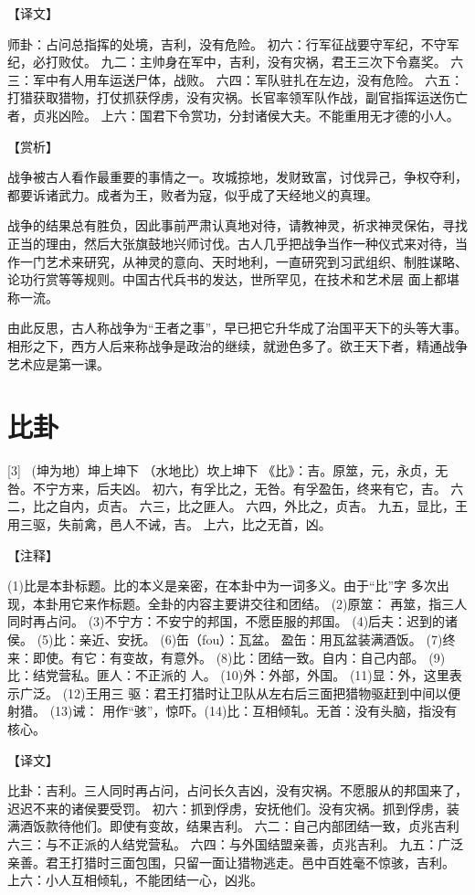 \documentclass[12pt,UTF8]{ctexbook}
\begin{document}
【译文】

师卦：占问总指挥的处境，吉利，没有危险。
初六：行军征战要守军纪，不守军纪，必打败仗。
九二：主帅身在军中，吉利，没有灾祸，君王三次下令嘉奖。
六三：军中有人用车运送尸体，战败。
六四：军队驻扎在左边，没有危险。
六五：打猎获取猎物，打仗抓获俘虏，没有灾祸。长官率领军队作战，副官指挥运送伤亡者，贞兆凶险。
上六：国君下令赏功，分封诸侯大夫。不能重用无才德的小人。

【赏析】

战争被古人看作最重要的事情之一。攻城掠地，发财致富，讨伐异己，争权夺利，都要诉诸武力。成者为王，败者为寇，似乎成了天经地义的真理。

战争的结果总有胜负，因此事前严肃认真地对待，请教神灵，祈求神灵保佑，寻找正当的理由，然后大张旗鼓地兴师讨伐。古人几乎把战争当作一种仪式来对待，当作一门艺术来研究，从神灵的意向、天时地利，一直研究到习武组织、制胜谋略、论功行赏等等规则。中国古代兵书的发达，世所罕见，在技术和艺术层 面上都堪称一流。

由此反思，古人称战争为“王者之事”，早已把它升华成了治国平天下的头等大事。相形之下，西方人后来称战争是政治的继续，就逊色多了。欲王天下者，精通战争艺术应是第一课。

\chapter{比卦}
[3] \ (坤为地）坤上坤下
（水地比）坎上坤下
《比》：吉。原筮，元，永贞，无咎。不宁方来，后夫凶。
初六，有孚比之，无咎。有孚盈缶，终来有它，吉。
六二，比之自内，贞吉。
六三，比之匪人。
六四，外比之，贞吉。
九五，显比，王用三驱，失前禽，邑人不诫，吉。
上六，比之无首，凶。

【注释】

(1)比是本卦标题。比的本义是亲密，在本卦中为一词多义。由于“比”字 多次出现，本卦用它来作标题。全卦的内容主要讲交往和团结。
(2)原筮： 再筮，指三人同时再占问。
(3)不宁方：不安宁的邦国，不愿臣服的邦国。
(4)后夫：迟到的诸侯。
(5)比：亲近、安抚。
(6)缶（fou）：瓦盆。 盈缶：用瓦盆装满酒饭。
(7)终来：即使。有它：有变故，有意外。
(8)比：团结一致。自内：自己内部。
(9)比：结党营私。匪人：不正派的 人。
(10)外：外部，外国。
(11)显：外，这里表示广泛。
(12)王用三 驱：君王打猎时让卫队从左右后三面把猎物驱赶到中间以便射猎。
(13)诫： 用作“骇”，惊吓。(14)比：互相倾轧。无首：没有头脑，指没有核心。

【译文】

比卦：吉利。三人同时再占问，占问长久吉凶，没有灾祸。不愿服从的邦国来了，迟迟不来的诸侯要受罚。
初六：抓到俘虏，安抚他们。没有灾祸。抓到俘虏，装满酒饭款待他们。即使有变故，结果吉利。
六二：自己内部团结一致，贞兆吉利
六三：与不正派的人结党营私。
六四：与外国结盟亲善，贞兆吉利。
九五：广泛亲善。君王打猎时三面包围，只留一面让猎物逃走。邑中百姓毫不惊骇，吉利。 上六：小人互相倾轧，不能团结一心，凶兆。
\end{document}
